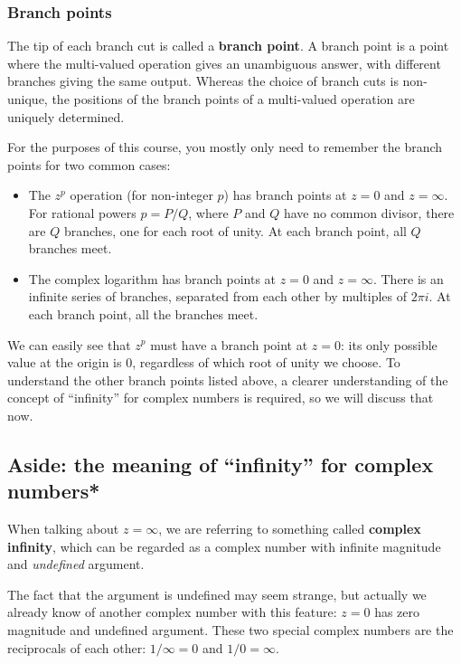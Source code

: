 \documentclass[10pt,a4paper]{article}
\begin{document}
\subsubsection{Branch points}
\label{branch-points}

The tip of each branch cut is called a \textbf{branch point}. A branch
point is a point where the multi-valued operation gives an unambiguous
answer, with different branches giving the same output. Whereas the
choice of branch cuts is non-unique, the positions of the branch points
of a multi-valued operation are uniquely determined.

For the purposes of this course, you mostly only need to remember the
branch points for two common cases:

\begin{itemize}
\item
  The $z^p$ operation (for non-integer $p$) has branch points at $z =
  0$ and $z = \infty$. For rational powers $p = P/Q$, where $P$ and
  $Q$ have no common divisor, there are $Q$ branches, one for each
  root of unity. At each branch point, all $Q$ branches meet.
\item
  The complex logarithm has branch points at $z = 0$ and $z =
  \infty$. There is an infinite series of branches, separated from
  each other by multiples of $2 \pi i$. At each branch point, all the
  branches meet.
\end{itemize}

\noindent
We can easily see that $z^p$ must have a branch point at $z = 0$: its
only possible value at the origin is $0$, regardless of which root of
unity we choose. To understand the other branch points listed above, a
clearer understanding of the concept of ``infinity'' for complex
numbers is required, so we will discuss that now.

\subsection{Aside: the meaning of ``infinity'' for complex numbers*}
\label{aside-the-meaning-of-infinity-for-complex-numbers}

When talking about $z = \infty$, we are referring to something called
\textbf{complex infinity}, which can be regarded as a complex number
with infinite magnitude and \emph{undefined} argument.

The fact that the argument is undefined may seem strange, but actually
we already know of another complex number with this feature: $z = 0$
has zero magnitude and undefined argument.  These two special complex
numbers are the reciprocals of each other: $1/\infty = 0$ and $1/0 =
\infty$.
\end{document}
